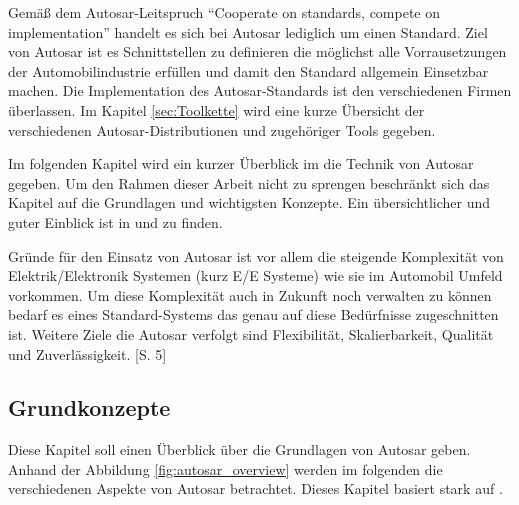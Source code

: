 \documentclass[
  a4paper,					    %
  twoside,
  DIV=calc,     				%
  bibliography=totoc,
  cleardoublepage=empty,
  ngerman,     					%
  final       					%
]{scrbook}
\begin{document}
Gemäß dem Autosar-Leitspruch "`Cooperate on standards, compete on implementation"' handelt es sich bei Autosar lediglich um einen Standard. Ziel von Autosar ist es Schnittstellen zu definieren die möglichst alle Vorrausetzungen der Automobilindustrie erfüllen und damit den Standard allgemein Einsetzbar machen. Die Implementation des Autosar-Standards ist den verschiedenen Firmen überlassen. Im Kapitel \ref{sec:Toolkette} wird eine kurze Übersicht der verschiedenen Autosar-Distributionen und zugehöriger Tools gegeben.

Im folgenden Kapitel wird ein kurzer Überblick im die Technik von Autosar gegeben. Um den Rahmen dieser Arbeit nicht zu sprengen beschränkt sich das Kapitel auf die Grundlagen und wichtigsten Konzepte. Ein übersichtlicher und guter Einblick ist in \cite{autosar_techoverview} und \cite{autosar_layer} zu finden.

Gründe für den Einsatz von Autosar ist vor allem die steigende Komplexität von Elektrik/Elektronik Systemen (kurz E/E Systeme) wie sie im Automobil Umfeld vorkommen. Um diese Komplexität auch in Zukunft noch verwalten zu können bedarf es eines Standard-Systems das genau auf diese Bedürfnisse zugeschnitten ist. Weitere Ziele die Autosar verfolgt sind Flexibilität, Skalierbarkeit, Qualität und Zuverlässigkeit. \cite{autosar_techoverview}[S. 5]

\subsection{Grundkonzepte}
\label{sec:Grundkonzepte}
Diese Kapitel soll einen Überblick über die Grundlagen von Autosar geben. Anhand der Abbildung \ref{fig:autosar_overview} werden im folgenden die verschiedenen Aspekte von Autosar betrachtet. Dieses Kapitel basiert stark auf \cite{autosar_techoverview}.
\end{document}
